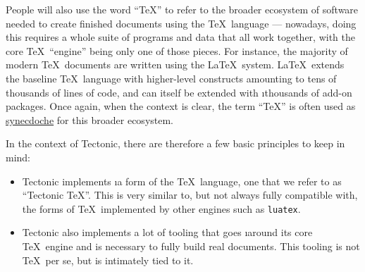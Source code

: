 People will also use the word “\TeX” to refer to the broader ecosystem of
software needed to create finished documents using the \TeX\ language —
nowadays, doing this requires a whole suite of programs and data that all work
together, with the core \TeX\ “engine” being only one of those pieces. For
instance, the majority of modern \TeX\ documents are written using the \LaTeX\
system. \LaTeX\ extends the baseline \TeX\ language with higher-level constructs
amounting to tens of thousands of lines of code, and can itself be extended with
\i{thousands} of add-on packages. Once again, when the context is clear, the
term “\TeX” is often used as
\href{https://en.wikipedia.org/wiki/Synecdoche}{synecdoche} for this broader
ecosystem.

In the context of Tectonic, there are therefore a few basic principles to keep
in mind:
\begin{itemize}
\item Tectonic implements \i{a form of} the \TeX\ language, one that we refer to
  as “Tectonic \TeX”. This is very similar to, but not always fully compatible
  with, the forms of \TeX\ implemented by other engines such as \texttt{luatex}.
\item Tectonic also implements a lot of tooling that goes \i{around} its core
  \TeX\ engine and is necessary to fully build real documents. This tooling is
  not \TeX\ per se, but is intimately tied to it.
\end{itemize}